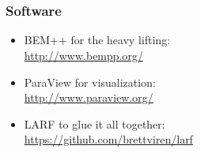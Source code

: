 \documentclass[xcolor=dvipsnames]{beamer}
\begin{document}
\section{}
\begin{frame}
  \frametitle{Software}
  \begin{itemize}
  \item BEM++ for the heavy lifting: \\
    \url{http://www.bempp.org/}
  \item ParaView for visualization: \\
    \url{http://www.paraview.org/}
  \item LARF to glue it all together: \\
    \url{https://github.com/brettviren/larf}
  \end{itemize}
  
\end{frame}
\end{document}
